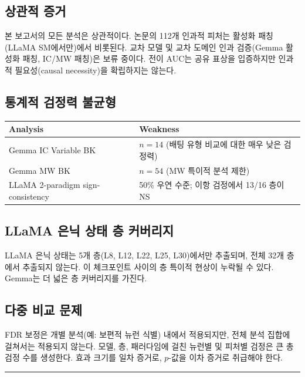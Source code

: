 \documentclass[11pt,a4paper]{article}
\begin{document}
\subsection{상관적 증거}

본 보고서의 모든 분석은 상관적이다. 논문의 112개 인과적 피처는 활성화 패칭(LLaMA SM에서만)에서 비롯된다. 교차 모델 및 교차 도메인 인과 검증(Gemma 활성화 패칭, IC/MW 패칭)은 보류 중이다. 전이 AUC는 공유 표상을 입증하지만 인과적 필요성(causal necessity)을 확립하지는 않는다.

\subsection{통계적 검정력 불균형}

\begin{table}[H]
\centering
\footnotesize
\begin{tabular}{lp{9cm}}
\toprule
Analysis & Weakness \\
\midrule
Gemma IC Variable BK & $n=14$ (배팅 유형 비교에 대한 매우 낮은 검정력) \\
Gemma MW BK & $n=54$ (MW 특이적 분석 제한) \\
LLaMA 2-paradigm sign-consistency & 50\% 우연 수준; 이항 검정에서 13/16 층이 NS \\
\bottomrule
\end{tabular}
\end{table}

\subsection{LLaMA 은닉 상태 층 커버리지}

LLaMA 은닉 상태는 5개 층(L8, L12, L22, L25, L30)에서만 추출되며, 전체 32개 층에서 추출되지 않는다. 이 체크포인트 사이의 층 특이적 현상이 누락될 수 있다. Gemma는 더 넓은 층 커버리지를 가진다.

\subsection{다중 비교 문제}

FDR 보정은 개별 분석(예: 보편적 뉴런 식별) 내에서 적용되지만, 전체 분석 집합에 걸쳐서는 적용되지 않는다. 모델, 층, 패러다임에 걸친 뉴런별 및 피처별 검정은 큰 총 검정 수를 생성한다. 효과 크기를 일차 증거로, $p$-값을 이차 증거로 취급해야 한다.

\bigskip\hrule\bigskip

\end{document}
